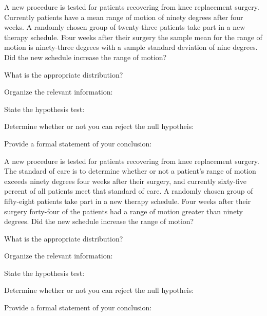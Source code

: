 
\begin{problem}
\item A new procedure is tested for patients recovering from knee
  replacement surgery. Currently patients have a mean range of motion
  of ninety degrees after four weeks. A randomly chosen group of
  twenty-three patients take part in a new therapy schedule. Four
  weeks after their surgery the sample mean for the range of motion is
  ninety-three degrees with a sample standard deviation of nine
  degrees. Did the new schedule increase the range of motion?

  \begin{subproblem}
  \item What is the appropriate distribution? 
  \item Organize the relevant information: \\ [30pt]
  \item State the hypothesis test: \\ [20pt]
  \item Determine whether or not you can reject the null hypotheis:
    \vfill
  \item Provide a formal statement of your conclusion: 
  \end{subproblem}

\clearpage

\item A new procedure is tested for patients recovering from knee
  replacement surgery. The standard of care is to determine whether or
  not a patient's range of motion exceeds ninety degrees four weeks
  after their surgery, and currently sixty-five percent of all
  patients meet that standard of care. A randomly chosen group of
  fifty-eight patients take part in a new therapy schedule. Four weeks
  after their surgery forty-four of the patients had a range of motion
  greater than ninety degrees. Did the new schedule increase the range
  of motion?

  \begin{subproblem}
  \item What is the appropriate distribution? 
  \item Organize the relevant information: \\ [30pt]
  \item State the hypothesis test: \\ [20pt]
  \item Determine whether or not you can reject the null hypotheis:
    \vfill
  \item Provide a formal statement of your conclusion: 
  \end{subproblem}


\end{problem}
